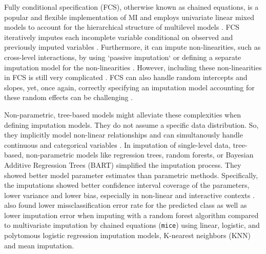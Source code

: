 \documentclass[10pt, a4paper, titlepage]{article}
\begin{document}
Fully conditional specification (FCS), otherwise known as chained equations, is a popular and flexible implementation of MI \citep{audigier2018, burgette2010, vanbuuren2007, grund2018a} and employs univariate linear mixed models to account for the hierarchical structure of multilevel models \citep{mistlerComparisonJointModel2017, enders2018, resche-rigon2018}. FCS iteratively imputes each incomplete variable conditional on observed and previously imputed variables \citep{mistlerComparisonJointModel2017, buurenFlexibleImputationMissing2018, enders2016, enders2018, enders2018a, hughes2014, grund2018a}. Furthermore, it can impute non-linearities, such as cross-level interactions, by using `passive imputation` or defining a separate imputation model for the non-linearities \citep{buurenFlexibleImputationMissing2018, grund2018}. However, including these non-linearities in FCS is still very complicated \citep{grund2021, grund2018,buurenFlexibleImputationMissing2018}. FCS can also handle random intercepts and slopes, yet, once again, correctly specifying an imputation model accounting for these random effects can be challenging \citep{grund2021, grund2018,buurenFlexibleImputationMissing2018}.


Non-parametric, tree-based models might alleviate these complexities when defining imputation models. They do not assume a specific data distribution. So, they implicitly model non-linear relationships and can simultanously handle continuous and categorical variables \citep{hill2020, burgette2010, lin2019, chipman2010, james2021, salditt2023, breiman1984}. In imputation of single-level data, tree-based, non-parametric models like regression trees, random forests, or Bayesian Additive Regression Trees (BART) simplified the imputation process. They showed better model parameter estimates than parametric methods. Specifically, the imputations showed better confidence interval coverage of the parameters, lower variance and lower bias, especially in non-linear and interactive contexts \citep{burgette2010, xu2016, silva2022}. \citet{waljee2013} also found lower missclassification error rate for the predicted class as well as lower imputation error when imputing with a random forest algorithm compared to multivariate imputation by chained equations (\texttt{mice}) using linear, logistic, and polytomous logistic regression imputation models, K-nearest neighbors (KNN) and mean imputation.
\end{document}
